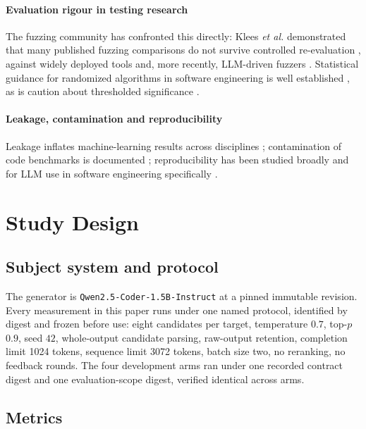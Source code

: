 \documentclass[10pt,conference,letterpaper]{IEEEtran}
\begin{document}
\paragraph{Evaluation rigour in testing research}
The fuzzing community has confronted this directly: Klees \emph{et al.}
demonstrated that many published fuzzing comparisons do not survive controlled
re-evaluation \cite{klees2018evaluating}, against widely deployed tools
\cite{serebryany2016libfuzzer,bohme2016aflfast} and, more recently, LLM-driven
fuzzers \cite{xia2024fuzz4all,deng2023titanfuzz}. Statistical guidance for
randomized algorithms in software engineering is well established
\cite{arcuri2014hitchhiker}, as is caution about thresholded significance
\cite{wasserstein2016asa,amrhein2019retire}.

\paragraph{Leakage, contamination and reproducibility}
Leakage inflates machine-learning results across disciplines
\cite{kapoor2023leakage}; contamination of code benchmarks is documented
\cite{yang2023rephrased,liu2023evalplus,chen2021codex,austin2021mbpp};
reproducibility has been studied broadly
\cite{gundersen2018reproducibility,hutson2018reproducibility,pineau2021reproducibility}
and for LLM use in software engineering specifically
\cite{sallou2024threats}.

\section{Study Design}
\label{sec:design}

\subsection{Subject system and protocol}

The generator is \texttt{Qwen2.5-Coder-1.5B-Instruct} at a pinned immutable
revision. Every measurement in this paper runs under one named protocol,
identified by digest and frozen before use: eight candidates per target,
temperature $0.7$, top-$p$ $0.9$, seed $42$, whole-output candidate parsing,
raw-output retention, completion limit 1024 tokens, sequence limit 3072 tokens,
batch size two, no reranking, no feedback rounds. The four development arms ran
under one recorded contract digest and one evaluation-scope digest, verified
identical across arms.

\subsection{Metrics}
\end{document}
